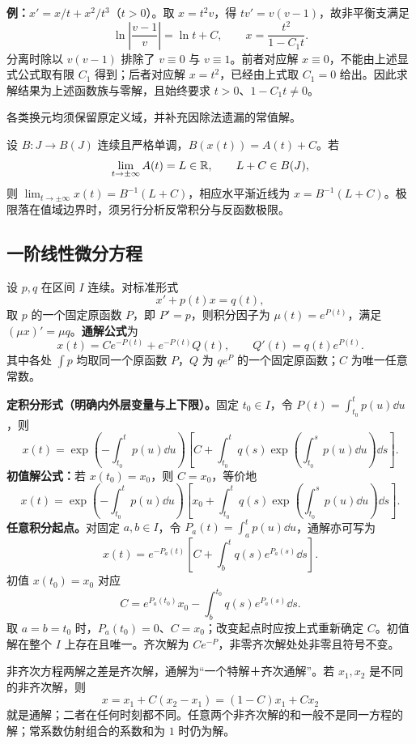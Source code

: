 \textbf{例：}$x'=x/t+x^2/t^3$（$t>0$）。取 $x=t^2v$，得 $tv'=v(v-1)$，故非平衡支满足
\[
\ln\left|\frac{v-1}{v}\right|=\ln t+C,
\qquad x=\frac{t^2}{1-C_1t}.
\]
分离时除以 $v(v-1)$ 排除了 $v\equiv0$ 与 $v\equiv1$。前者对应解 $x\equiv0$，不能由上述显式公式取有限 $C_1$ 得到；后者对应解 $x=t^2$，已经由上式取 $C_1=0$ 给出。因此求解结果为上述函数族与零解，且始终要求 $t>0$、$1-C_1t\ne0$。

各类换元均须保留原定义域，并补充因除法遗漏的常值解。

设 $B:J\to B(J)$ 连续且严格单调，$B(x(t))=A(t)+C$。若
\[
\lim_{t\to\pm\infty}A(t)=L\in\mathbb R,\qquad L+C\in B(J),
\]
则 $\lim_{t\to\pm\infty}x(t)=B^{-1}(L+C)$，相应水平渐近线为 $x=B^{-1}(L+C)$。极限落在值域边界时，须另行分析反常积分与反函数极限。

\subsection{一阶线性微分方程}
\core 设 $p,q$ 在区间 $I$ 连续。对标准形式
\[
\boxed{x'+p(t)x=q(t),}
\]
取 $p$ 的一个固定原函数 $P$，即 $P'=p$，则积分因子为 $\mu(t)=e^{P(t)}$，满足 $(\mu x)'=\mu q$。\textbf{通解公式}为
\[
\boxed{x(t)=Ce^{-P(t)}+e^{-P(t)}Q(t),\qquad Q'(t)=q(t)e^{P(t)}.}
\]
其中各处 $\int p$ 均取同一个原函数 $P$，$Q$ 为 $qe^P$ 的一个固定原函数；$C$ 为唯一任意常数。

\textbf{定积分形式（明确内外层变量与上下限）。}固定 $t_0\in I$，令 $P(t)=\int_{t_0}^t p(u)\dd u$，则
\[
\boxed{
x(t)=\exp\!\left(-\int_{t_0}^t p(u)\dd u\right)
\left[C+\int_{t_0}^t q(s)\exp\!\left(\int_{t_0}^s p(u)\dd u\right)\dd s\right].}
\]
\textbf{初值解公式：}若 $x(t_0)=x_0$，则 $C=x_0$，等价地
\[
\boxed{x(t)=\exp\!\left(-\int_{t_0}^t p(u)\dd u\right)
\left[x_0+\int_{t_0}^t q(s)\exp\!\left(\int_{t_0}^s p(u)\dd u\right)\dd s\right].}
\]
\textbf{任意积分起点。}对固定 $a,b\in I$，令 $P_a(t)=\int_a^t p(u)\dd u$，通解亦可写为
\[
x(t)=e^{-P_a(t)}\left[C+\int_b^t q(s)e^{P_a(s)}\dd s\right].
\]
初值 $x(t_0)=x_0$ 对应
\[
C=e^{P_a(t_0)}x_0-\int_b^{t_0}q(s)e^{P_a(s)}\dd s.
\]
取 $a=b=t_0$ 时，$P_a(t_0)=0$、$C=x_0$；改变起点时应按上式重新确定 $C$。初值解在整个 $I$ 上存在且唯一。齐次解为 $Ce^{-P}$，非零齐次解处处非零且符号不变。

非齐次方程两解之差是齐次解，通解为“一个特解＋齐次通解”。若 $x_1,x_2$ 是不同的非齐次解，则
\[
x=x_1+C(x_2-x_1)=(1-C)x_1+Cx_2
\]
就是通解；二者在任何时刻都不同。任意两个非齐次解的和一般不是同一方程的解；常系数仿射组合的系数和为 $1$ 时仍为解。

